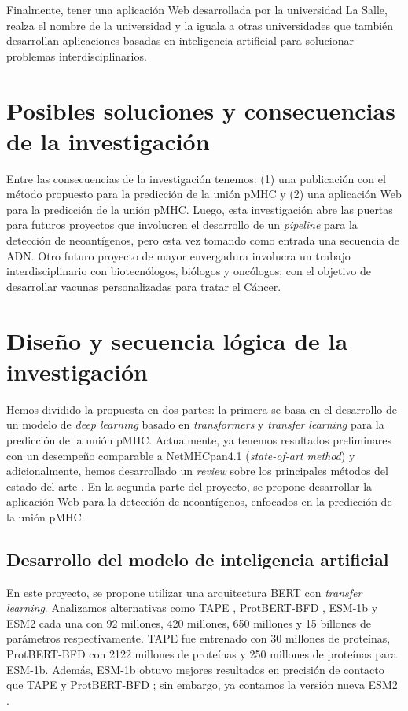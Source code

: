 \documentclass[a4paper]{article}
\begin{document}
Finalmente, tener una aplicación Web desarrollada por la universidad La Salle, realza el nombre de la universidad y la iguala a otras universidades que también desarrollan aplicaciones basadas en inteligencia artificial para solucionar  problemas interdisciplinarios.


\section{Posibles soluciones y consecuencias de la investigación}

Entre las consecuencias de la investigación tenemos: (1) una publicación con el método propuesto para la predicción de la unión pMHC y (2) una aplicación Web para la predicción de la unión pMHC. Luego, esta investigación abre las puertas para futuros proyectos que involucren el desarrollo de un \textit{pipeline} para la detección de neoantígenos, pero esta vez tomando como entrada una secuencia de ADN. Otro futuro proyecto de mayor envergadura involucra un trabajo interdisciplinario con biotecnólogos, biólogos y oncólogos; con el objetivo de desarrollar vacunas personalizadas para tratar el Cáncer. 

\section{Diseño y secuencia lógica de la investigación} 

Hemos dividido la propuesta en dos partes: la primera se basa en el desarrollo de un modelo de \textit{deep learning} basado en \textit{transformers} y \textit{transfer learning} para la predicción de la unión pMHC. Actualmente, ya tenemos resultados preliminares con un desempeño comparable a NetMHCpan4.1 (\textit{state-of-art method}) \citep{arceda2023neoantigen} y adicionalmente, hemos desarrollado un \textit{review} sobre los principales métodos del estado del arte \citep{machaca2023deep}. En la segunda parte del proyecto, se propone desarrollar la aplicación Web para la detección de neoantígenos, enfocados en la predicción de la unión pMHC.

\subsection{Desarrollo del modelo de inteligencia artificial}

En este proyecto, se propone utilizar una arquitectura BERT con \textit{transfer learning}. Analizamos alternativas como TAPE \citep{rao2019evaluating}, ProtBERT-BFD \citep{elnaggar2021prottrans}, ESM-1b \citep{rives2021biological} y ESM2 \citep{lin2023evolutionary} cada una con 92 millones, 420 millones, 650 millones y 15 billones de parámetros respectivamente. TAPE fue entrenado con 30 millones de proteínas, ProtBERT-BFD con 2122 millones de proteínas y 250 millones de proteínas para ESM-1b. Además, ESM-1b obtuvo mejores resultados en precisión de contacto que TAPE y ProtBERT-BFD \citep{rives2021biological}; sin embargo, ya contamos la versión nueva ESM2 \citep{lin2023evolutionary}.\\
\end{document}
